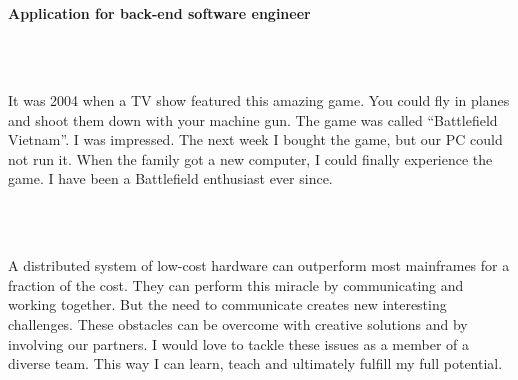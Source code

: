\documentclass[11pt,a4paper,arial]{moderncv}        %
\begin{document}
\date{2017-04-23}

\makelettertitle

~\\
~

\textbf {Application for back-end software engineer}

~\\
~

It was 2004 when a TV show featured this amazing game. You could fly in planes and shoot them down with your machine gun. The game was
called ``Battlefield Vietnam''. I was impressed. The next week I bought the game, but our PC could not run it.
When the family got a new computer, I could finally experience the game. I have been a Battlefield enthusiast ever since.

~\\
~

A distributed system of low-cost hardware can outperform most mainframes for a fraction of the cost.
They can perform this miracle by communicating and working together. But the need to communicate creates new interesting challenges.
These obstacles can be overcome with creative solutions and by involving our partners. I would love to tackle these issues
as a member of a diverse team. This way I can learn, teach and ultimately fulfill my full potential.



~\\
~
\end{document}
